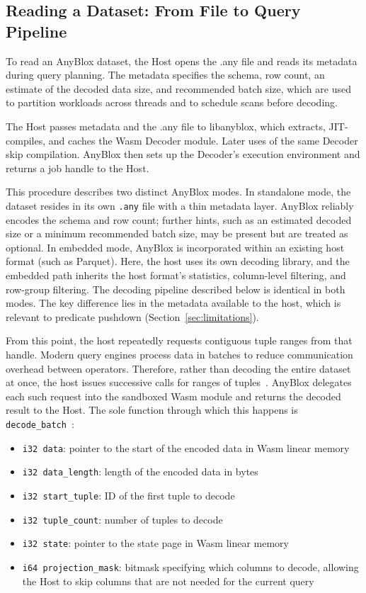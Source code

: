\subsection{Reading a Dataset: From File to Query Pipeline}

To read an AnyBlox dataset, the Host opens the .any file and reads its metadata during query planning. The metadata specifies the schema, row count, an estimate of the decoded data size, and recommended batch size, which are used to partition workloads across threads and to schedule scans before decoding.

The Host passes metadata and the .any file to libanyblox, which extracts, JIT-compiles, and caches the Wasm Decoder module. Later uses of the same Decoder skip compilation. AnyBlox then sets up the Decoder's execution environment and returns a job handle to the Host.

This procedure describes two distinct AnyBlox modes. In standalone mode, the dataset resides in its own \texttt{.any} file with a thin metadata layer. AnyBlox reliably encodes the schema and row count; further hints, such as an estimated decoded size or a minimum recommended batch size, may be present but are treated as optional. In embedded mode, AnyBlox is incorporated within an existing host format (such as Parquet). Here, the host uses its own decoding library, and the embedded path inherits the host format's statistics, column-level filtering, and row-group filtering. The decoding pipeline described below is identical in both modes. The key difference lies in the metadata available to the host, which is relevant to predicate pushdown (Section~\ref{sec:limitations}).

From this point, the host repeatedly requests contiguous tuple ranges from that handle. Modern query engines process data in batches to reduce communication overhead between operators. Therefore, rather than decoding the entire dataset at once, the host issues successive calls for ranges of tuples~\cite{leisMorseldrivenParallelismNUMAaware2014}. AnyBlox delegates each such request into the sandboxed Wasm module and returns the decoded result to the Host. The sole function through which this happens is \texttt{decode\_batch}~\cite{gienieczkoAnyBloxFrameworkSelfDecoding2025}:

\begin{itemize}
    \item \texttt{i32 data}: pointer to the start of the encoded data in Wasm linear memory
    \item \texttt{i32 data\_length}: length of the encoded data in bytes
    \item \texttt{i32 start\_tuple}: ID of the first tuple to decode
    \item \texttt{i32 tuple\_count}: number of tuples to decode
    \item \texttt{i32 state}: pointer to the state page in Wasm linear memory
    \item \texttt{i64 projection\_mask}: bitmask specifying which columns to decode, allowing the Host to skip columns that are not needed for the current query
\end{itemize}

